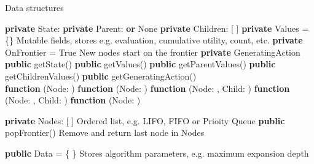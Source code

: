 \begin{algorithm}[H]
    \caption{Data structures}
    \label{alg:general_tree_search_data}
    \begin{algorithmic}[1]
            \State \textbf{private} State: 
            \State \textbf{private} Parent:  \textbf{or} None
            \State \textbf{private} Children: [ ]
            \State \textbf{private} Values = \{\}
            \Comment Mutable fields, stores e.g. evaluation, cumulative utility, count, etc.
            \State \textbf{private} OnFrontier = True            
            \Comment New nodes start on the frontier
            \State \textbf{private} GeneratingAction
            \\
            \State \textbf{public} getState()
            \State \textbf{public} getValues()
            \State \textbf{public} getParentValues()
            \State \textbf{public} getChildrenValues()
            \State \textbf{public} getGeneratingAction()
        \EndObj
        \\
        \State \textbf{function} (Node: )
        \State \textbf{function} (Node: )
        \State \textbf{function} (Node: , Child: )
        \State \textbf{function} (Node: , Child: )
        \State \textbf{function} (Node: )
    \end{algorithmic}
    \vspace{.25cm}
    \begin{algorithmic}[1]
            \State \textbf{private} Nodes: [ ]
            \Comment Ordered list, e.g. LIFO, FIFO or Prioity Queue
            \State \textbf{public} popFrontier()
            \Comment Remove and return last node in Nodes
            \EndObj
    \end{algorithmic}
    \vspace{.25cm}
    \begin{algorithmic}[1]
            \State \textbf{public} Data = \{ \}
            \Comment Stores algorithm parameters, e.g. maximum expansion depth
        \EndObj
    \end{algorithmic}
\end{algorithm}